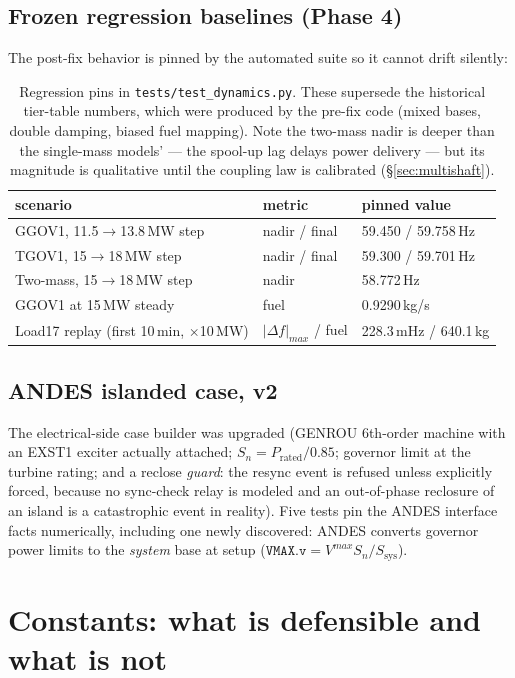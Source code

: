 \documentclass[11pt]{article}
\begin{document}
\subsection{Frozen regression baselines (Phase 4)}
The post-fix behavior is pinned by the automated suite so it cannot drift
silently:
\begin{table}[h]\centering
\small
\begin{tabular}{lll}
\toprule
scenario & metric & pinned value \\
\midrule
GGOV1, 11.5$\to$13.8\,MW step & nadir / final & 59.450 / 59.758\,Hz \\
TGOV1, 15$\to$18\,MW step & nadir / final & 59.300 / 59.701\,Hz \\
Two-mass, 15$\to$18\,MW step & nadir & 58.772\,Hz \\
GGOV1 at 15\,MW steady & fuel & 0.9290\,kg/s \\
Load17 replay (first 10\,min, $\times$10\,MW) & $|\Delta f|_{max}$ / fuel & 228.3\,mHz / 640.1\,kg \\
\bottomrule
\end{tabular}
\caption{Regression pins in \texttt{tests/test\_dynamics.py}. These
supersede the historical tier-table numbers, which were produced by the
pre-fix code (mixed bases, double damping, biased fuel mapping). Note the
two-mass nadir is deeper than the single-mass models' --- the spool-up lag
delays power delivery --- but its magnitude is qualitative until the
coupling law is calibrated (\S\ref{sec:multishaft}).}
\end{table}

\subsection{ANDES islanded case, v2}
The electrical-side case builder was upgraded (GENROU 6th-order machine
with an EXST1 exciter actually attached; $S_n = P_\text{rated}/0.85$;
governor limit at the turbine rating; and a reclose \emph{guard}: the
resync event is refused unless explicitly forced, because no sync-check
relay is modeled and an out-of-phase reclosure of an island is a
catastrophic event in reality). Five tests pin the ANDES interface facts
numerically, including one newly discovered: ANDES converts governor
power limits to the \emph{system} base at setup
($\texttt{VMAX.v} = V^{max} S_n / S_\text{sys}$).

\section{Constants: what is defensible and what is not}
\end{document}
